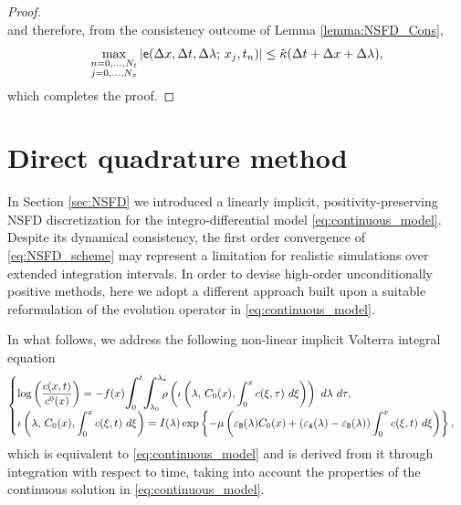 \documentclass[a4paper, UKenglish, numberwithinsect, thm-restate]{tgdk-v2021}
\begin{document}
\begin{proof}
\begin{equation*}
    \end{equation*}
    and therefore, from the consistency outcome of Lemma \ref{lemma:NSFD_Cons}, 
    \begin{equation*}
            \max_{\substack{n=0,\dots, N_t \\ j=0,\dots, N_x}}|\mathsf{e}(\Delta x, \Delta t, \Delta \lambda; \,  x_j,t_n)| \leq \Tilde{\kappa} (\Delta t+\Delta x + \Delta \lambda),
    \end{equation*}
    which completes the proof.
\end{proof}

\section{Direct quadrature method}\label{sec:DQ}
In Section \ref{sec:NSFD} we introduced a linearly implicit, positivity-preserving NSFD discretization for the integro-differential model \eqref{eq:continuous_model}. Despite its dynamical consistency, the first order convergence of \eqref{eq:NSFD_scheme} may represent a limitation for realistic simulations over extended integration intervals. In order to devise high-order unconditionally positive methods, here we adopt a different approach built upon a suitable reformulation of the evolution operator in \eqref{eq:continuous_model}.

In what follows, we address the following non-linear implicit Volterra  integral equation \cite{MPV_implicit}
\begin{equation}\label{eq:VFIE_model}
    \begin{cases}
         \displaystyle \log\left(\dfrac{c(x,t)}{c^0(x)}\right)=-f(x) \scalebox{1.3}{$\displaystyle\int$}_{\!\!\!\!\! 0}^{t}  \scalebox{1.3}{$\displaystyle\int$}_{\!\!\!\!\! \lambda_{0}}^{\lambda_{*}} \!\!\! \rho\left(\iota\left(\lambda,\, C_0(x), \int_0^x    c(\xi,\tau)  \ d\xi\right)\right) \ d\lambda \ d \tau,  \\
         \displaystyle \iota  \left(  \lambda,\, C_0(x),  \int_0^x   c(\xi,t) \ d\xi  \right)  =  I(\lambda) \exp  \left\{  -  \mu  \left(  \varepsilon_\texttt{B}(\lambda) C_0(x) +  (\varepsilon_\texttt{A}(\lambda) -\varepsilon_\texttt{B}(\lambda))  \int_0^x    c(\xi,t)  \ d\xi  \right)  \right\},
    \end{cases} 
\end{equation}
which is equivalent to \eqref{eq:continuous_model} and is derived from it through integration with respect to time, taking into account the properties of the continuous solution in \eqref{eq:continuous_model}.
\end{document}
